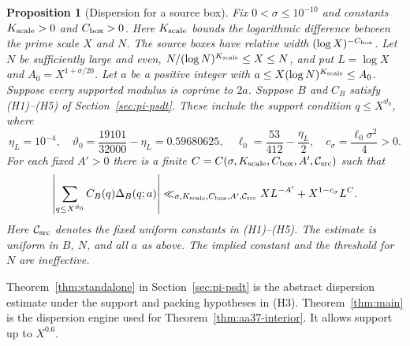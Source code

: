 \documentclass{amsart}
\numberwithin{equation}{section}
\theoremstyle{definition}
\theoremstyle{plain}
\newtheorem*{introproposition}{Proposition}
\begin{document}
\begin{introproposition}[Dispersion for a source box]
Fix $0<\sigma\le10^{-10}$ and constants $K_{\rm scale}>0$ and
$C_{\rm box}>0$. Here $K_{\rm scale}$ bounds the logarithmic
difference between the prime scale $X$ and $N$. The source boxes have
relative width $(\log X)^{-C_{\rm box}}$.
Let $N$ be sufficiently large and even,
$N/(\log N)^{K_{\rm scale}}\le X\le N$, and put
$L=\log X$ and $A_0=X^{1+\sigma/20}$.
Let $a$ be a positive integer with
$a\le X(\log N)^{K_{\rm scale}}\le A_0$.
Suppose every supported modulus is coprime to $2a$.
Suppose $B$ and $C_B$ satisfy (H1)--(H5) of
Section~\ref{sec:pi-psdt}. These include the support condition
$q\le X^{\vartheta_0}$, where
\[
 \eta_L=10^{-4},\quad
 \vartheta_0=\frac{19101}{32000}-\eta_L=0.59680625,
 \quad \ell_0=\frac{53}{412}-\frac{\eta_L}2,
 \quad c_\sigma=\frac{\ell_0\sigma^2}{4}>0.
\]
For each fixed $A'>0$ there is a finite
$C=C(\sigma,K_{\rm scale},C_{\rm box},A',\mathcal C_{\rm src})$
such that
\begin{equation}\label{eq:intro-dispersion}
 \left|\sum_{q\le X^{\vartheta_0}}
       C_B(q)\Delta_B(q;a)\right|
 \ll_{\sigma,K_{\rm scale},C_{\rm box},A',\mathcal C_{\rm src}}
       XL^{-A'}+X^{1-c_\sigma}L^C.
\end{equation}
Here $\mathcal C_{\rm src}$ denotes the fixed uniform constants in
(H1)--(H5). The estimate is uniform in $B$, $N$, and all $a$ as above.
The implied constant and the threshold for $N$ are ineffective.
\end{introproposition}

Theorem~\ref{thm:standalone} in Section~\ref{sec:pi-psdt}
is the abstract dispersion estimate under the support and packing
hypotheses in (H3).
Theorem~\ref{thm:main} is the dispersion engine used for
Theorem~\ref{thm:aa37-interior}. It allows support up to $X^{0.6}$.
\end{document}
